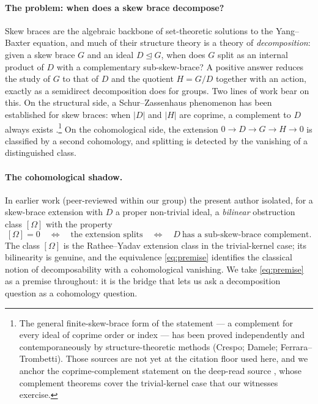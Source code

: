 \documentclass[11pt]{article}
\theoremstyle{definition}
\begin{document}
\paragraph{The problem: when does a skew brace decompose?}
Skew braces are the algebraic backbone of set-theoretic solutions to the Yang--Baxter
equation, and much of their structure theory is a theory of \emph{decomposition}: given a
skew brace $G$ and an ideal $D\trianglelefteq G$, when does $G$ split as an internal product
of $D$ with a complementary sub-skew-brace? A positive answer reduces the study of $G$ to
that of $D$ and the quotient $H=G/D$ together with an action, exactly as a semidirect
decomposition does for groups. Two lines of work bear on this. On the structural side, a
Schur--Zassenhaus phenomenon has been established for skew braces: when $|D|$ and $|H|$ are
coprime, a complement to $D$ always exists \cite{RY}.\footnote{The general finite-skew-brace form of the statement --- a complement for
every ideal of coprime order or index --- has been proved independently and
contemporaneously by structure-theoretic methods (Crespo; Damele; Ferrara--Trombetti). Those
sources are not yet at the citation floor used here, and we anchor the coprime-complement
statement on the deep-read source \cite{RY}, whose complement theorems cover the trivial-kernel
case that our witnesses exercise.} On the cohomological side, the extension
$0\to D\to G\to H\to 0$ is classified by a second cohomology, and splitting is detected by
the vanishing of a distinguished class.

\paragraph{The cohomological shadow.}
In earlier work (peer-reviewed within our group) the present author isolated, for a
skew-brace extension with $D$ a proper non-trivial ideal, a \emph{bilinear} obstruction
class $[\Omega]$ with the property
\begin{equation}\label{eq:premise}
[\Omega]=0
\quad\Longleftrightarrow\quad
\text{the extension splits}
\quad\Longleftrightarrow\quad
D\ \text{has a sub-skew-brace complement.}
\end{equation}
The class $[\Omega]$ is the Rathee--Yadav extension class \cite{RY} in the trivial-kernel
case; its bilinearity is genuine, and the equivalence \eqref{eq:premise} identifies the
classical notion of decomposability with a cohomological vanishing. We take
\eqref{eq:premise} as a premise throughout: it is the bridge that lets us ask a
decomposition question as a cohomology question.
\end{document}
